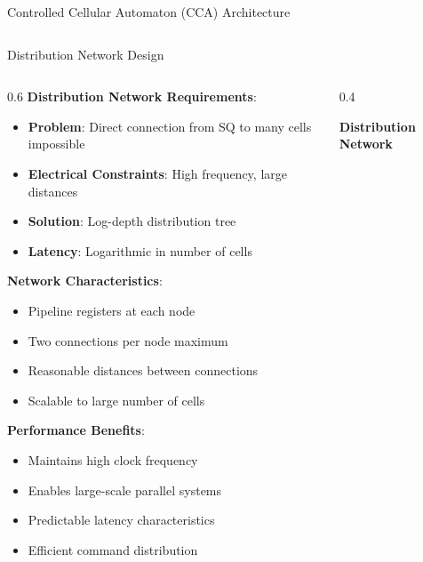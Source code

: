 \documentclass[aspectratio=169]{beamer}
\newcommand{\concept}[1]{\textbf{\color{darkblue}#1}}
\begin{document}
\begin{frame}{Controlled Cellular Automaton (CCA) Architecture}
\begin{columns}
\end{columns}
\end{frame}

\begin{frame}{Distribution Network Design}
\begin{columns}
\begin{column}{0.6\textwidth}
\concept{Distribution Network Requirements}:
\begin{itemize}
\item \textbf{Problem}: Direct connection from SQ to many cells impossible
\item \textbf{Electrical Constraints}: High frequency, large distances
\item \textbf{Solution}: Log-depth distribution tree
\item \textbf{Latency}: Logarithmic in number of cells
\end{itemize}

\vspace{0.3cm}
\concept{Network Characteristics}:
\begin{itemize}
\item Pipeline registers at each node
\item Two connections per node maximum
\item Reasonable distances between connections
\item Scalable to large number of cells
\end{itemize}

\vspace{0.3cm}
\concept{Performance Benefits}:
\begin{itemize}
\item Maintains high clock frequency
\item Enables large-scale parallel systems
\item Predictable latency characteristics
\item Efficient command distribution
\end{itemize}
\end{column}
\begin{column}{0.4\textwidth}
\begin{center}
\textbf{Distribution Network}
\vspace{0.3cm}


\end{center}
\end{column}
\end{columns}
\end{frame}
\end{document}
